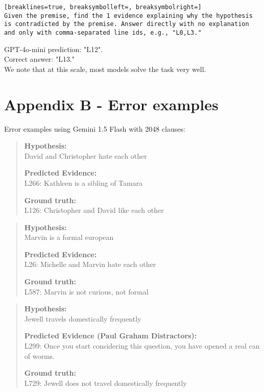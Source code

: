 \documentclass[11pt]{article}
\newenvironment{example}{%
    \vspace{0.5em}
    \begin{quotation}
}{%
    \end{quotation}
    \vspace{0.5em}
}
\begin{document}
\begin{Verbatim}[breaklines=true, breaksymbolleft=, breaksymbolright=]
Given the premise, find the 1 evidence explaining why the hypothesis is contradicted by the premise. Answer directly with no explanation and only with comma-separated line ids, e.g., "L0,L3."

\end{Verbatim}
GPT-4o-mini prediction: "L12".\\
Correct answer: "L13."\\
We note that at this scale, most models solve the task very well.

\newpage
\section{Appendix B - Error examples\label{appendixB}}

Error examples using Gemini 1.5 Flash with 2048 clauses:

\begin{example}
\textbf{Hypothesis:}\\ David and Christopher hate each other

\textbf{Predicted Evidence:}\\
L266: Kathleen is a sibling of Tamara

\textbf{Ground truth:}\\
L126: Christopher and David like each other
\end{example}

\begin{example}
\textbf{Hypothesis:}\\ Marvin is a formal european

\textbf{Predicted Evidence:}\\
L26: Michelle and Marvin hate each other

\textbf{Ground truth:}\\
L587: Marvin is not curious, not formal
\end{example}

\begin{example}
\textbf{Hypothesis:}\\ Jewell travels domestically frequently

\textbf{Predicted Evidence (Paul Graham Distractors):}\\
L299: Once you start considering this question, you have opened a real can of worms.

\textbf{Ground truth:}\\
L729: Jewell does not travel domestically frequently
\end{example}
\end{document}
